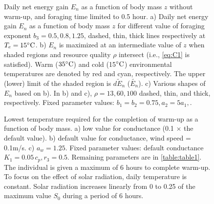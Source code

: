 \begin{figure}[H]
\begin{center}
\caption{
	 Daily net energy gain  $E_n$ as a function of body mass $z$ without warm-up, and foraging time limited to 0.5 hour.
	a) Daily net energy gain  $E_n$ as a function of body mass $z$ for different value of foraging exponent $b_3 = 0.5, 0.8, 1.25$, dashed, thin, thick lines respectively  at $T_e  = 15 ^{\circ} \rm{C}$.
	b) $E_n$ is maximized at an intermediate value of $z$  when shaded regions and resource quality $\rho$ intersect (i.e., \cref{eq:C1} is satisfied).
	Warm ($35^{\circ} \rm{C}$) and cold (15$^{\circ} \rm{C}$) environmental temperatures are denoted by red and cyan, respectively.
	The upper (lower) limit of the shaded region is $\widetilde{dE_n}$ ($\widetilde{E_n}$).
	c) Various shapes of $E_n$ based on b).
	In b) and c), $\rho = 13, 60, 100$ dashed, thin, and thick, respectively.
	Fixed parameter values: $b_1 = b_2 = 0.75, a_2 = 5 a_1, $.
}
\label{fig3}
\end{center}
\end{figure}
%
\begin{figure}[H]
\begin{center}
\caption{
	Lowest temperature required for the completion of warm-up as a function of body mass.
	a)  low value for conductance (0.1 $\times$ the default value).
	b) default value for conductance, wind speed  = 0.1m/s.
	c)  $a_w = 1.25$.
	Fixed parameter values: default conductance $K_1 = 0.05 \, c_p, r_3 = 0.5$.
	Remaining parameters are in \cref{table:table1}.
	The individual is given a maximum of 6 hours to complete warm-up.
	To focus on the effect of solar radiation, daily temperature is constant.
	Solar radiation increases linearly from 0 to 0.25 of the maximum value $S_0$ during a period of 6 hours.
}%
\label{fig4}
\end{center}
\end{figure}
